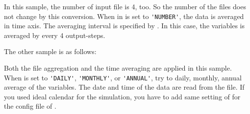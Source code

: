 
In this sample, the number of input file is 4, too. So the number of the files does not change by this conversion.
When  in  is set to \verb|'NUMBER'|, the data is averaged in time axis. The averaging interval is specified by . In this case, the variables is averaged by every 4 output-steps.

The other sample is as follows:


Both the file aggregation and the time averaging are applied in this sample.\\
When  is set to \verb|'DAILY'|, \verb|'MONTHLY'|, or \verb|'ANNUAL'|, \sno try to daily, monthly, annual average of the variables. The date and time of the data are read from the file.
If you used ideal calendar for the simulation, you have to add same setting of  for the config file of \sno.

